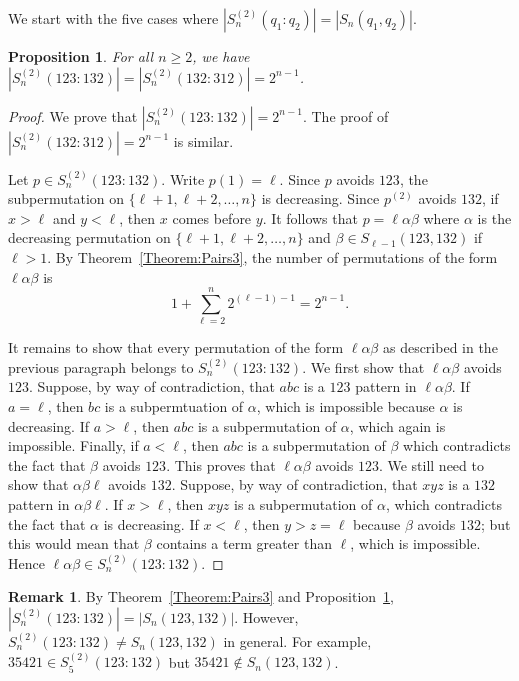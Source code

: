 \documentclass[11pt]{article}
\newtheorem{proposition}[theorem]{Proposition}
\theoremstyle{definition}
\newtheorem{remark}[theorem]{Remark}
\numberwithin{equation}{section}
\begin{document}
We start with the five cases where $|S_n^{(2)}(q_1:q_2)|=|S_n(q_1,q_2)|$.

\begin{proposition}\label{Prop:123;132}
For all $n\geq2$, we have $|S_n^{(2)}(123:132)|=|S_n^{(2)}(132:312)|=2^{n-1}$.
\end{proposition}
\begin{proof}
We prove that $|S_n^{(2)}(123:132)|=2^{n-1}$. The proof of $|S_n^{(2)}(132:312)|=2^{n-1}$ is similar.

Let $p\in S_n^{(2)}(123:132)$. Write $p(1)=\ell$. Since $p$ avoids $123$, the subpermutation on $\{\ell+1,\ell+2,\ldots,n\}$ is decreasing. Since $p^{(2)}$ avoids $132$, if $x>\ell$ and $y<\ell$, then $x$ comes before $y$. It follows that $p=\ell\alpha\beta$ where $\alpha$ is the decreasing permutation on $\{\ell+1,\ell+2,\ldots,n\}$ and $\beta\in S_{\ell-1}(123,132)$ if $\ell>1$. By Theorem~\ref{Theorem:Pairs3}, the number of permutations of the form $\ell\alpha\beta$ is
    \[
    1+\sum_{\ell=2}^n2^{(\ell-1)-1}=2^{n-1}.
    \]

It remains to show that every permutation of the form $\ell\alpha\beta$ as described in the previous paragraph belongs to $S_n^{(2)}(123:132)$. We first show that $\ell\alpha\beta$ avoids $123$. Suppose, by way of contradiction, that $abc$ is a $123$ pattern in $\ell\alpha\beta$. If $a=\ell$, then $bc$ is a subpermtuation of $\alpha$, which is impossible because $\alpha$ is decreasing. If $a>\ell$, then $abc$ is a subpermutation of $\alpha$, which again is impossible. Finally, if $a<\ell$, then $abc$ is a subpermutation of $\beta$ which contradicts the fact that $\beta$ avoids $123$. This proves that $\ell\alpha\beta$ avoids $123$. We still need to show that $\alpha\beta\ell$ avoids $132$. Suppose, by way of contradiction, that $xyz$ is a $132$ pattern in $\alpha\beta\ell$. If $x>\ell$, then $xyz$ is a subpermutation of $\alpha$, which contradicts the fact that $\alpha$ is decreasing. If $x<\ell$, then $y>z=\ell$ because $\beta$ avoids $132$; but this would mean that $\beta$ contains a term greater than $\ell$, which is impossible. Hence $\ell\alpha\beta\in S_n^{(2)}(123:132)$.
\end{proof}

\begin{remark}
By Theorem~\ref{Theorem:Pairs3} and Proposition~\ref{Prop:123;132}, $|S_n^{(2)}(123:132)|=|S_n(123,132)|$. However, $S_n^{(2)}(123:132)\neq S_n(123,132)$ in general. For example, $35421\in S_5^{(2)}(123:132)$ but $35421\notin S_n(123,132)$.
\end{remark}
\end{document}

